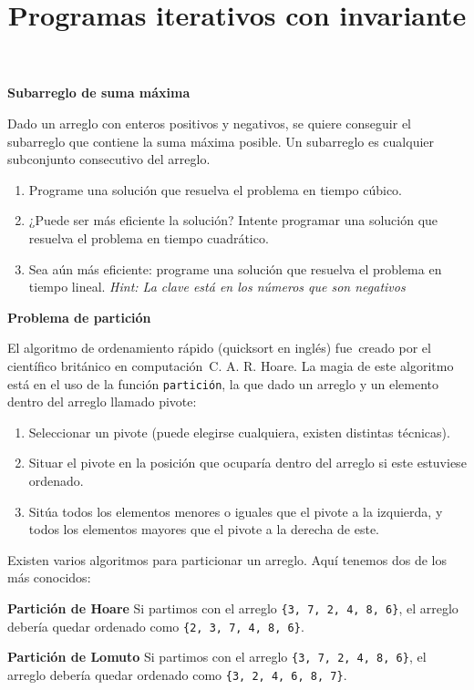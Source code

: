 \documentclass[dcc, sol]{fcfmcourse}
\title[2]{Programas iterativos con invariante}
\begin{document}
\maketitle

\begin{problems}
\problem \textbf{Subarreglo de suma máxima}

Dado un arreglo con enteros positivos y negativos, se quiere conseguir el subarreglo que contiene la suma máxima posible. Un subarreglo es cualquier subconjunto consecutivo del arreglo. 

\begin{enumerate}
    \item Programe una solución que resuelva el problema en tiempo cúbico.
    \item ¿Puede ser más eficiente la solución? Intente programar una solución que resuelva el problema en tiempo cuadrático.
    \item Sea aún más eficiente: programe una solución que resuelva el problema en tiempo lineal. \textit{Hint: La clave está en los números que son negativos}
\end{enumerate}

\problem \textbf{Problema de partición}

El algoritmo de ordenamiento r\'apido (quicksort en ingl\'es) fue creado por el cient\'ifico brit\'anico en computaci\'on C. A. R. Hoare. La magia de este algoritmo está en el uso de la función \texttt{partición}, la que dado un arreglo y un elemento dentro del arreglo llamado pivote:
\begin{enumerate}[1.]
   \item Seleccionar un pivote (puede elegirse cualquiera, existen distintas técnicas).  
   \item Situar el pivote en la posición que ocuparía dentro del arreglo si este  estuviese ordenado.
    \item Sitúa todos los elementos menores o iguales que el pivote a la izquierda,  y todos los elementos mayores que el pivote a la derecha de este.
\end{enumerate}
 Existen varios algoritmos para particionar un arreglo. Aquí tenemos dos de los más conocidos:
 
 
 
 \textbf{Partición de Hoare}  Si partimos con el arreglo \texttt{\{3, 7, 2, 4, 8, 6\}}, el arreglo debería quedar ordenado como \texttt{\{2, 3, 7, 4, 8, 6\}}.

 
 \textbf{Partición de Lomuto} Si partimos con el arreglo \texttt{\{3, 7, 2, 4, 8, 6\}}, el arreglo debería quedar ordenado como \texttt{\{3, 2, 4, 6, 8, 7\}}.



\end{problems}
\end{document}

